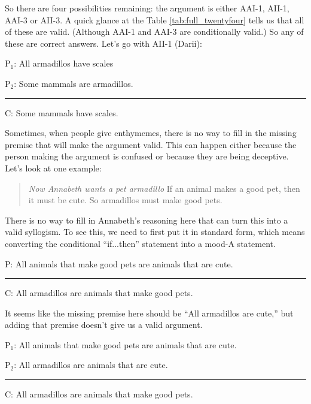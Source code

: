 So there are four possibilities remaining: the argument is either AAI-1, AII-1, AAI-3 or AII-3. A quick glance at the Table \ref{tab:full_twentyfour} tells us that all of these are valid. (Although AAI-1 and AAI-3 are conditionally valid.) So any of these are correct answers. Let's go with AII-1 (Darii):


\begin{earg}
\item[P$_1$:] All armadillos have scales
\item[P$_2$:] Some mammals are armadillos.
\vspace{-.5em}
\item [] \rule{0.3\linewidth}{.5pt} 
\item[C:] Some mammals have scales. 
\end{earg}

Sometimes, when people give enthymemes, there is no way to fill in the missing premise that will make the argument valid. This can happen either because the person making the argument is confused or because they are being deceptive. Let's look at one example: 

\begin{quotation}\noindent\textit{Now Annabeth wants a pet armadillo} If an animal makes a good pet, then it must be cute. So armadillos must make good pets. \end{quotation}

There is no way to fill in Annabeth's reasoning here that can turn this into a valid syllogism. To see this, we need to first put it in standard form, which means converting the conditional ``if...then'' statement into a mood-A statement. 


\begin{earg}
\item[P:] All animals that make good pets are animals that are cute. 
\vspace{-.5em}
\item [] \rule{0.6\linewidth}{.5pt} 
\item[C:] All armadillos are animals that make good pets. 
\end{earg}

It seems like the missing premise here should be ``All armadillos are cute,''  but adding that premise doesn't give us a valid argument. 

\begin{earg}
\item[P$_1$:] All animals that make good pets are animals that are cute.
\item[P$_2$:] All armadillos are animals that are cute. 
\vspace{-.5em}
\item [] \rule{0.6\linewidth}{.5pt} 
\item[C:] All armadillos are animals that make good pets.   
\end{earg}


